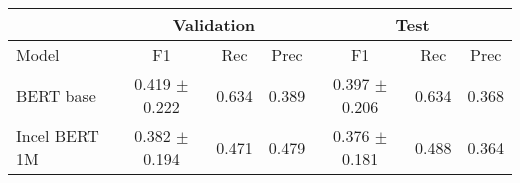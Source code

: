 \begin{tabular}{l|ccc|ccc}
\hline
                                      &  \multicolumn{3}{c|}{Validation}              & \multicolumn{3}{c}{Test} \\
\hline
                         Model &      F1   & Rec & Prec &       F1  &  Rec   &  Prec \\
\hline
                     BERT base &   0.419 $\pm$          0.222 &    0.634 &     0.389 &    0.397 $\pm$           0.206 &     0.634 &      0.368 \\
                 Incel BERT 1M &   0.382 $\pm$          0.194 &    0.471 &     0.479 &    0.376 $\pm$           0.181 &     0.488 &      0.364 \\
\hline
\end{tabular}
